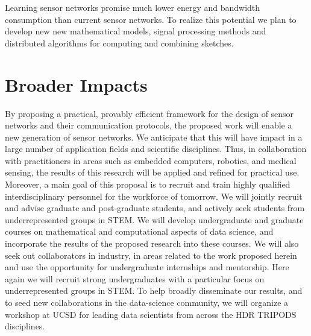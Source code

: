 \documentclass{article}
\begin{document}
Learning sensor networks promise much lower energy and bandwidth
consumption than current sensor networks. To realize this potential we
plan to develop new new mathematical models, signal processing methods
and distributed algorithms for computing and combining sketches.
\fi



\section{Broader Impacts}
By proposing a practical, provably efficient  framework for the design of sensor networks and their communication protocols, the proposed work will enable a new generation of sensor networks. We anticipate that this will have impact in a large number of application fields and scientific disciplines. Thus, in collaboration with practitioners in areas such as embedded computers, robotics, and medical sensing, the results of this research will be applied and refined for practical use. 
Moreover, a main goal of this proposal is to recruit and train highly qualified interdisciplinary personnel for the workforce of tomorrow. We will jointly recruit and advise graduate and post-graduate students, and actively seek students from underrepresented groups in STEM. We will develop undergraduate and graduate courses on mathematical and computational aspects of data science, and incorporate the
results of the proposed research into these courses. We will also seek out collaborators in industry, in areas related to the work proposed herein and use the opportunity for undergraduate internships and mentorship. Here again we will recruit strong undergraduates with a particular focus on underrepresented groups in STEM.
To help broadly disseminate our results, and to seed new collaborations in the data-science community, we will organize a workshop at UCSD for leading data scientists from across the HDR TRIPODS disciplines. 
\end{document}
